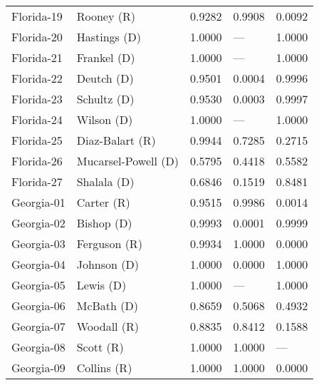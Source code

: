 \begin{longtable}{llrll}
        Florida-19 &            {\color{Red} Rooney (R)} &       0.9282 &        0.9908 &        0.0092 \\
        Florida-20 &         {\color{Blue} Hastings (D)} &       1.0000 &           --- &        1.0000 \\
        Florida-21 &          {\color{Blue} Frankel (D)} &       1.0000 &           --- &        1.0000 \\
        Florida-22 &           {\color{Blue} Deutch (D)} &       0.9501 &        0.0004 &        0.9996 \\
        Florida-23 &          {\color{Blue} Schultz (D)} &       0.9530 &        0.0003 &        0.9997 \\
        Florida-24 &           {\color{Blue} Wilson (D)} &       1.0000 &           --- &        1.0000 \\
        Florida-25 &       {\color{Red} Diaz-Balart (R)} &       0.9944 &        0.7285 &        0.2715 \\
        Florida-26 &  {\color{Blue} Mucarsel-Powell (D)} &       0.5795 &        0.4418 &        0.5582 \\
        Florida-27 &          {\color{Blue} Shalala (D)} &       0.6846 &        0.1519 &        0.8481 \\
        Georgia-01 &            {\color{Red} Carter (R)} &       0.9515 &        0.9986 &        0.0014 \\
        Georgia-02 &           {\color{Blue} Bishop (D)} &       0.9993 &        0.0001 &        0.9999 \\
        Georgia-03 &          {\color{Red} Ferguson (R)} &       0.9934 &        1.0000 &        0.0000 \\
        Georgia-04 &          {\color{Blue} Johnson (D)} &       1.0000 &        0.0000 &        1.0000 \\
        Georgia-05 &            {\color{Blue} Lewis (D)} &       1.0000 &           --- &        1.0000 \\
        Georgia-06 &           {\color{Blue} McBath (D)} &       0.8659 &        0.5068 &        0.4932 \\
        Georgia-07 &           {\color{Red} Woodall (R)} &       0.8835 &        0.8412 &        0.1588 \\
        Georgia-08 &             {\color{Red} Scott (R)} &       1.0000 &        1.0000 &           --- \\
        Georgia-09 &           {\color{Red} Collins (R)} &       1.0000 &        1.0000 &        0.0000 \\

\end{longtable}
